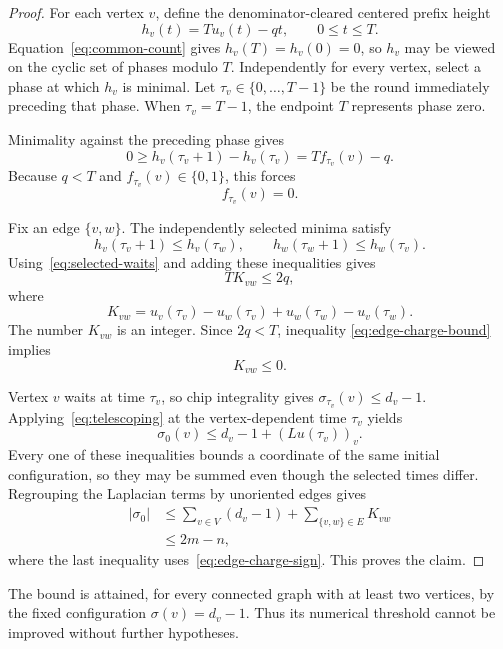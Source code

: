 \documentclass[11pt]{article}
\theoremstyle{definition}
\theoremstyle{remark}
\newcommand{\chips}[1]{\lvert #1\rvert}
\begin{document}
\begin{proof}
For each vertex $v$, define the denominator-cleared centered prefix height
\[
   h_v(t)=T u_v(t)-qt,\qquad 0\le t\le T.
\]
Equation~\eqref{eq:common-count} gives $h_v(T)=h_v(0)=0$, so $h_v$ may be
viewed on the cyclic set of phases modulo $T$. Independently for every
vertex, select a phase at which $h_v$ is minimal. Let
$\tau_v\in\{0,\ldots,T-1\}$ be the round immediately preceding that phase.
When $\tau_v=T-1$, the endpoint $T$ represents phase zero.

Minimality against the preceding phase gives
\[
  0\ge h_v(\tau_v+1)-h_v(\tau_v)=T f_{\tau_v}(v)-q.
\]
Because $q<T$ and $f_{\tau_v}(v)\in\{0,1\}$, this forces
\begin{equation}\label{eq:selected-waits}
  f_{\tau_v}(v)=0.
\end{equation}

Fix an edge $\{v,w\}$. The independently selected minima satisfy
\[
  h_v(\tau_v+1)\le h_v(\tau_w),
  \qquad
  h_w(\tau_w+1)\le h_w(\tau_v).
\]
Using~\eqref{eq:selected-waits} and adding these inequalities gives
\begin{equation}\label{eq:edge-charge-bound}
   T K_{vw}\le 2q,
\end{equation}
where
\[
  K_{vw}=
  u_v(\tau_v)-u_w(\tau_v)
  +u_w(\tau_w)-u_v(\tau_w).
\]
The number $K_{vw}$ is an integer. Since $2q<T$, inequality
\eqref{eq:edge-charge-bound} implies
\begin{equation}\label{eq:edge-charge-sign}
   K_{vw}\le 0.
\end{equation}

Vertex $v$ waits at time $\tau_v$, so chip integrality gives
$\sigma_{\tau_v}(v)\le d_v-1$. Applying~\eqref{eq:telescoping} at the
vertex-dependent time $\tau_v$ yields
\[
  \sigma_0(v)
  \le d_v-1+(Lu(\tau_v))_v.
\]
Every one of these inequalities bounds a coordinate of the same initial
configuration, so they may be summed even though the selected times differ.
Regrouping the Laplacian terms by unoriented edges gives
\[
\begin{aligned}
  \chips{\sigma_0}
  &\le \sum_{v\in V}(d_v-1)
       +\sum_{\{v,w\}\in E}K_{vw}\\
  &\le 2m-n,
\end{aligned}
\]
where the last inequality uses~\eqref{eq:edge-charge-sign}. This proves the
claim.
\end{proof}

The bound is attained, for every connected graph with at least two vertices,
by the fixed configuration $\sigma(v)=d_v-1$. Thus its numerical threshold
cannot be improved without further hypotheses.
\end{document}
